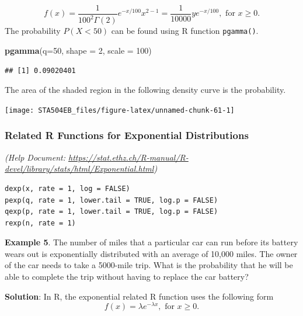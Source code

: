 \documentclass[
]{book}
\newenvironment{Shaded}{\begin{snugshade}}{\end{snugshade}}
\newcommand{\AttributeTok}[1]{\textcolor[rgb]{0.13,0.29,0.53}{#1}}
\newcommand{\DecValTok}[1]{\textcolor[rgb]{0.00,0.00,0.81}{#1}}
\newcommand{\FunctionTok}[1]{\textcolor[rgb]{0.13,0.29,0.53}{\textbf{#1}}}
\newcommand{\NormalTok}[1]{#1}
\begin{document}
\[
f(x) = \frac{1}{100^2\Gamma(2)}e^{-x/100} x^{2-1} = \frac{1}{10000}ye^{-x/100}, \mbox{ for } x \ge 0.
\]
The probability \(P(X < 50)\) can be found using R function \texttt{pgamma()}.

\begin{Shaded}
\begin{Highlighting}[]
\FunctionTok{pgamma}\NormalTok{(}\AttributeTok{q=}\DecValTok{50}\NormalTok{, }\AttributeTok{shape =} \DecValTok{2}\NormalTok{, }\AttributeTok{scale =} \DecValTok{100}\NormalTok{)}
\end{Highlighting}
\end{Shaded}

\begin{verbatim}
## [1] 0.09020401
\end{verbatim}

The area of the shaded region in the following density curve is the probability.

\begin{center}\texttt{[image: STA504EB\_files/figure-latex/unnamed-chunk-61-1]} \end{center}

\hfill\break

\hypertarget{related-r-functions-for-exponential-distributions}{%
\subsubsection{Related R Functions for Exponential Distributions}\label{related-r-functions-for-exponential-distributions}}

\emph{(Help Document: \url{https://stat.ethz.ch/R-manual/R-devel/library/stats/html/Exponential.html})}

\begin{verbatim}
dexp(x, rate = 1, log = FALSE)
pexp(q, rate = 1, lower.tail = TRUE, log.p = FALSE)
qexp(p, rate = 1, lower.tail = TRUE, log.p = FALSE)
rexp(n, rate = 1)
\end{verbatim}

\textbf{Example 5}. The number of miles that a particular car can run before its battery wears out is exponentially distributed with an average of 10,000 miles. The owner of the car needs to take a 5000-mile trip. What is the probability that he will be able to complete the trip without having to replace the car battery?

\textbf{Solution}: In R, the exponential related R function uses the following form
\[
f(x) = \lambda e^{-\lambda x}, \mbox{ for } x \ge 0.
\]
\end{document}
